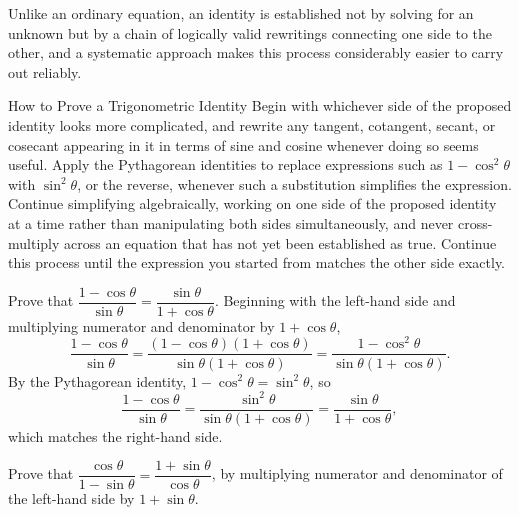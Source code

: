 Unlike an ordinary equation, an identity is established not by solving for
an unknown but by a chain of logically valid rewritings connecting one side
to the other, and a systematic approach makes this process considerably
easier to carry out reliably.

\begin{algorithmproc}{How to Prove a Trigonometric Identity}
Begin with whichever side of the proposed identity looks more complicated,
and rewrite any tangent, cotangent, secant, or cosecant appearing in it in
terms of sine and cosine whenever doing so seems useful. Apply the
Pythagorean identities to replace expressions such as $1 - \cos^2\theta$
with $\sin^2\theta$, or the reverse, whenever such a substitution
simplifies the expression. Continue simplifying algebraically, working on
one side of the proposed identity at a time rather than manipulating both
sides simultaneously, and never cross-multiply across an equation that has
not yet been established as true. Continue this process until the
expression you started from matches the other side exactly.
\end{algorithmproc}

\begin{example}
Prove that $\dfrac{1-\cos\theta}{\sin\theta} = \dfrac{\sin\theta}{1+\cos\theta}$.
Beginning with the left-hand side and multiplying numerator and denominator
by $1+\cos\theta$,
\[
\frac{1-\cos\theta}{\sin\theta} =
\frac{(1-\cos\theta)(1+\cos\theta)}{\sin\theta(1+\cos\theta)} =
\frac{1-\cos^2\theta}{\sin\theta(1+\cos\theta)}.
\]
By the Pythagorean identity, $1-\cos^2\theta = \sin^2\theta$, so
\[
\frac{1-\cos\theta}{\sin\theta} =
\frac{\sin^2\theta}{\sin\theta(1+\cos\theta)} = \frac{\sin\theta}{1+\cos\theta},
\]
which matches the right-hand side.
\end{example}

\begin{practicenow}
Prove that $\dfrac{\cos\theta}{1-\sin\theta} = \dfrac{1+\sin\theta}{\cos\theta}$,
by multiplying numerator and denominator of the left-hand side by
$1+\sin\theta$.
\end{practicenow}

